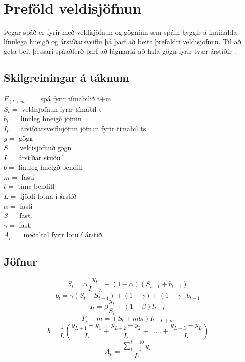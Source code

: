 \section {Þreföld veldisjöfnun}
 

Þegar spáð er fyrir með veldisjöfnun og gögninn sem spáin byggir á innihalda línulega hneigð og árstíðarsveiflu þá þarf að beita þrefaldri veldisjöfnun. 
Til að geta beit þessari spáaðferð þarf að lágmarki að hafa gögn fyrir tvær árstíðir .

\subsection{Skilgreiningar á táknum}
	$F_(t+m)=$ spá fyrir tímabilið  t+m \\
	$S_t =$  veldisjöfnun fyrir tímabil t\\ 	
	$b_t =$ línuleg hneigð jöfnin \\
	$I_t =$ árstíðarsveiflujöfnn jöfnun fyrir tímabil ts \\
	$y =$ gögn\\
	$S =$ veldisjöfnuð gögn \\
	$I =$	árstíðar stuðull \\
	$b =$ línuleg hneigð bendill \\
	$m =$ fasti	\\
	$t =$ tíma bendill \\
	$L =$ fjöldi lotna í árstíð \\
	$\alpha =$ fasti \\
	$\beta =$ fasti \\
	$\gamma =$ fasti \\
	$A_p =$ meðaltal fyrir lotu í árstíð\\


\subsection{Jöfnur}
	
	
	$$S_t = \alpha\dfrac{y_t}{I_{t - L}} + (1-\alpha)(S_{t-1}+ b_{t-1} ) $$
	$$b_t = \gamma  (S_{t}-S_{t-1})+(1- \gamma) + (1 - \gamma)b_{t-1}$$
	$$I_t = \beta \dfrac{y_t}{S_t} +(1-\beta)I_{t-L} $$
	$$F_t+m = (S_{t} +mb_{t})I_{t-L+m}$$
	$$b= \dfrac{1}{L}(\dfrac{y_{L+1}-y_1}{L} + \dfrac{y_{L+2}-y_2}{L}+......+ \dfrac{y_{L+L}-y_L}{L} ) $$
	$$A_p = \dfrac{\sum_{i=1}^{t=10} y_i}{L} $$